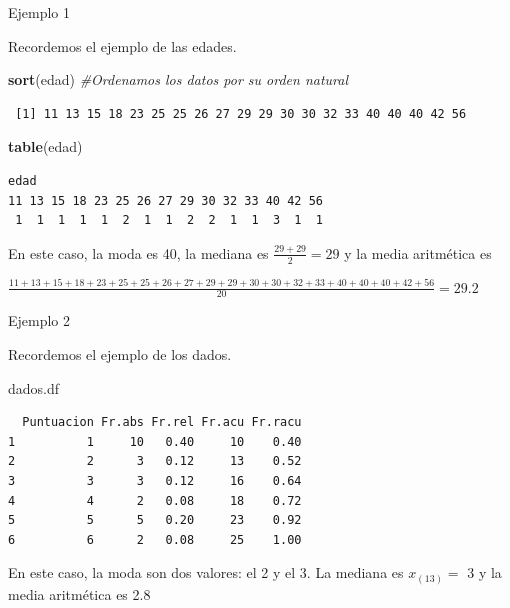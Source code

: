 \documentclass[
  ignorenonframetext,
]{beamer}
\newenvironment{Shaded}{\begin{snugshade}}{\end{snugshade}}
\newcommand{\CommentTok}[1]{\textcolor[rgb]{0.56,0.35,0.01}{\textit{#1}}}
\newcommand{\KeywordTok}[1]{\textcolor[rgb]{0.13,0.29,0.53}{\textbf{#1}}}
\newcommand{\NormalTok}[1]{#1}
\begin{document}
\begin{frame}[fragile]{Ejemplo 1}
\protect\hypertarget{ejemplo-1-3}{}

Recordemos el ejemplo de las edades.

\begin{Shaded}
\begin{Highlighting}[]
\KeywordTok{sort}\NormalTok{(edad) }\CommentTok{#Ordenamos los datos por su orden natural}
\end{Highlighting}
\end{Shaded}

\begin{verbatim}
 [1] 11 13 15 18 23 25 25 26 27 29 29 30 30 32 33 40 40 40 42 56
\end{verbatim}

\begin{Shaded}
\begin{Highlighting}[]
\KeywordTok{table}\NormalTok{(edad)}
\end{Highlighting}
\end{Shaded}

\begin{verbatim}
edad
11 13 15 18 23 25 26 27 29 30 32 33 40 42 56 
 1  1  1  1  1  2  1  1  2  2  1  1  3  1  1 
\end{verbatim}

En este caso, la moda es 40, la mediana es \(\frac{29+29}{2}=29\) y la
media aritmética es

\(\frac{11+13+15+18+23+25+25+26+27+29+29+30+30+32+33+40+40+40+42+56}{20}=29.2\)

\end{frame}

\begin{frame}[fragile]{Ejemplo 2}
\protect\hypertarget{ejemplo-2-4}{}

Recordemos el ejemplo de los dados.

\begin{Shaded}
\begin{Highlighting}[]
\NormalTok{dados.df}
\end{Highlighting}
\end{Shaded}

\begin{verbatim}
  Puntuacion Fr.abs Fr.rel Fr.acu Fr.racu
1          1     10   0.40     10    0.40
2          2      3   0.12     13    0.52
3          3      3   0.12     16    0.64
4          4      2   0.08     18    0.72
5          5      5   0.20     23    0.92
6          6      2   0.08     25    1.00
\end{verbatim}

En este caso, la moda son dos valores: el 2 y el 3. La mediana es
\(x_{(13)}=\) 3 y la media aritmética es 2.8

\end{frame}
\end{document}
